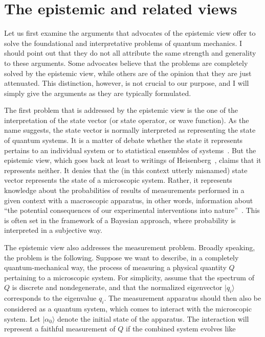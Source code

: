 \documentclass[12pt]{article}
\begin{document}
\section{The epistemic and related views}
%
Let us first examine the arguments that
advocates of the epistemic view offer to solve
the foundational and interpretative problems of
quantum mechanics.  I should point out that they
do not all attribute the same strength and generality to
these arguments.  Some advocates believe that the
problems are completely solved by the epistemic view,
while others are of the opinion
that they are just attenuated.  This distinction,
however, is not crucial to our purpose, and I will simply
give the arguments as they are typically formulated.

The first problem that is addressed by the epistemic
view is the one of the interpretation of the state
vector (or state operator, or wave function).
As the name suggests, the state vector is normally
interpreted as representing the state of quantum
systems.  It is a matter of debate whether the state it
represents pertains to an individual system or to statistical
ensembles of systems~\cite{ballentine}.  But the epistemic
view, which goes back at least to writings of
Heisenberg~\cite{heisenberg}, claims that it represents
neither.  It denies that the (in this context utterly
misnamed) state vector represents the state of a
microscopic system.  Rather, it represents
knowledge about the probabilities of results of
measurements performed in a given context with a
macroscopic apparatus, in other words, information about
``the potential consequences of our experimental
interventions into nature''~\cite{fuchs2}.  This
is often set in the framework of a Bayesian approach,
where probability is interpreted in a subjective way.

The epistemic view also addresses the
measurement problem. Broadly speaking, the problem
is the following.  Suppose we want to describe, in a
completely quantum-mechanical way, the process of
measuring a physical quantity $Q$ pertaining to a
microscopic system.  For simplicity, assume that the
spectrum of $Q$ is discrete and nondegenerate, and
that the normalized eigenvector $|q_i\rangle$
corresponds to the eigenvalue $q_i$.  The measurement
apparatus should then also be considered as a quantum
system, which comes to interact with the microscopic system.
Let $|\alpha_0 \rangle$ denote the initial state of the
apparatus.  The interaction will represent a faithful
measurement of $Q$ if the combined system evolves like
%
\end{document}

